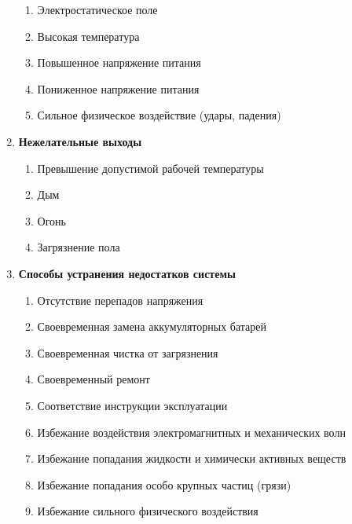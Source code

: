 \begin{enumerate}
\begin{enumerate}[label*=\arabic*.]
        \item Электростатическое поле
        \item Высокая температура
        \item Повышенное напряжение питания
        \item Пониженное напряжение питания
        \item Сильное физическое воздействие (удары, падения)
    \end{enumerate}
    \item \textbf{Нежелательные выходы}
    \begin{enumerate}[label*=\arabic*.]
        \item Превышение допустимой рабочей температуры
        \item Дым
        \item Огонь
        \item Загрязнение пола
    \end{enumerate}
    \item \textbf{Способы устранения недостатков системы}
    \begin{enumerate}[label*=\arabic*.]
        \item Отсутствие перепадов напряжения
        \item Своевременная замена аккумуляторных батарей
        \item Своевременная чистка от загрязнения
        \item Своевременный ремонт
        \item Соответствие инструкции эксплуатации
        \item Избежание воздействия электромагнитных и механических волн
        \item Избежание попадания жидкости и химически активных веществ
        \item Избежание попадания особо крупных частиц (грязи)
        \item Избежание сильного физического воздействия
    \end{enumerate}
\end{enumerate}
